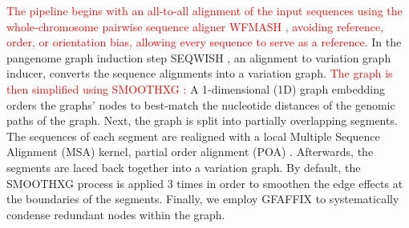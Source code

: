 \documentclass{bioinfo}
\theoremstyle{definition}
\newcommand{\red}[1]{{\textcolor{Red}{#1}}}
\begin{document}
	\red{The pipeline begins with an all-to-all alignment of the input sequences using the whole-chromosome pairwise sequence aligner WFMASH \citep{wfmash}, avoiding reference, order, or orientation bias, allowing every sequence to serve as a reference.}
	In the pangenome graph induction step SEQWISH \citep{Garrison2022}, an alignment to variation graph inducer, converts the sequence alignments into a variation graph. 
	\red{The graph is then simplified using SMOOTHXG \citep{Garrison2023}:}
	A 1-dimensional (1D) graph embedding \citep{Heumos2023} orders the graphs’ nodes to best-match the nucleotide distances of the genomic paths of the graph.
	Next, the graph is split into partially overlapping segments. 
	The sequences of each segment are realigned with a local Multiple Sequence Alignment (MSA) kernel, partial order alignment (POA) \citep{Lee2002}.
	Afterwards, the segments are laced back together into a variation graph. 
	By default, the SMOOTHXG process is applied 3 times in order to smoothen the edge effects at the boundaries of the segments.
	Finally, we employ GFAFFIX \citep{Liao2023} to systematically condense redundant nodes within the graph.
	
\end{document}
